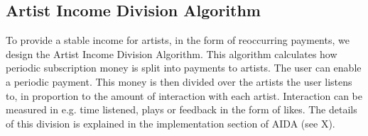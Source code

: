 \subsection{Artist Income Division Algorithm}
\label{sec:aida-design}
To provide a stable income for artists, in the form of reoccurring payments, we design the Artist Income Division Algorithm. This algorithm calculates how periodic subscription money is split into payments to artists. The user can enable a periodic payment. This money is then divided over the artists the user listens to, in proportion to the amount of interaction with each artist. Interaction can be measured in e.g. time listened, plays or feedback in the form of likes. The details of this division is explained in the implementation section of AIDA (see X).
